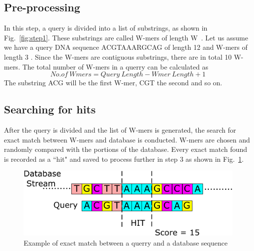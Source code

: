 \subsection{Pre-processing}
In this step, a query is divided into a list of substrings, as shown in Fig.~\ref{fig:step1}. 
These substrings are called W-mers of length W~\cite{sotiriades2007design}. 
Let us assume we have a query DNA sequence ACGTAAARGCAG of length 12 and W-mers of length 3 \cite{sotiriades2007design}. 
Since the W-mers are contiguous substrings, there are in total 10 W-mers. 
The total number of W-mers in a querry can be calculated as 
\begin{equation}
\label{eq1}
No.of \ Wmers = Query \ Length - Wmer \ Length + 1 
\end{equation}
The substring ACG will be the first W-mer, CGT the second and so on. 



\subsection{Searching for hits}
After the query is divided and the list of W-mers is generated, the search for exact match between W-mers and database is conducted.
W-mers are chosen and randomly compared with the portions of the database. 
Every exact match found is recorded as a ``hit" and saved to process further in step 3 as shown in Fig.~\ref{fig:step2}. 

\begin{figure}[t!]
\centering
\includegraphics[width=\columnwidth]{Figures/Algorithm2.pdf}
\caption{Example of exact match between a querry and a database sequence} \label{fig:step2}
\end{figure}



